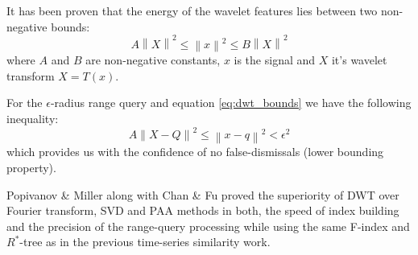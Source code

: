 It has been proven \cite{citeulike:499150} that the energy of the wavelet features lies between two non-negative bounds:
\begin{equation}
A \left\| X \right\|^{2} \leq \left\| x \right\|^{2} \leq B \left\| X \right\|^{2}
\label{eq:dwt_bounds}
\end{equation}
where $A$ and $B$ are non-negative constants, $x$ is the signal and $X$ it's wavelet transform $X=T(x)$. 

For the $\epsilon$-radius range query and equation \ref{eq:dwt_bounds} we have the following inequality:
\begin{equation}
A \left\| X-Q \right\|^{2} \leq \left\| x-q \right\|^{2} < \epsilon^{2} 
\label{eq:range}
\end{equation}
which provides us with the confidence of no false-dismissals (lower bounding property).

Popivanov \& Miller along with Chan \& Fu \cite{citeulike:4384535} proved the superiority of DWT over Fourier transform, SVD and PAA methods in both, the speed of index building and the precision of the range-query processing while using the same F-index and $R^{*}$-tree as in the previous time-series similarity work.  